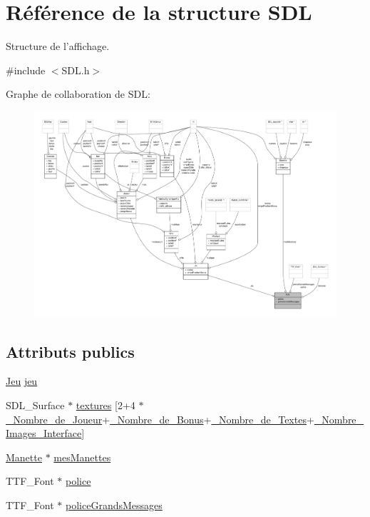 \hypertarget{structSDL}{\section{Référence de la structure S\-D\-L}
\label{structSDL}
}


Structure de l'affichage.  




{\ttfamily \#include $<$S\-D\-L.\-h$>$}



Graphe de collaboration de S\-D\-L\-:\nopagebreak
\begin{figure}[H]
\begin{center}
\leavevmode
\includegraphics[width=350pt]{structSDL__coll__graph}
\end{center}
\end{figure}
\subsection*{Attributs publics}
\begin{DoxyCompactItemize}
\item 
\hyperlink{structJeu}{Jeu} \hyperlink{structSDL_aed6e34a843f7e278abbc6401e7a86748}{jeu}
\item 
S\-D\-L\-\_\-\-Surface $\ast$ \hyperlink{structSDL_a7a8c5288d76cf72d0f5ba90ef4046d58}{textures} \mbox{[}2+4 $\ast$\hyperlink{Constantes_8h_a505b3b803482fbd73a5eafac78db730f}{\-\_\-\-Nombre\-\_\-de\-\_\-\-Joueur}+\hyperlink{Constantes_8h_af4e31715ab308023d6200e64b86b9946}{\-\_\-\-Nombre\-\_\-de\-\_\-\-Bonus}+\hyperlink{Constantes_8h_a64872e3ddf1efd6847f90dbcb0ed21ce}{\-\_\-\-Nombre\-\_\-de\-\_\-\-Textes}+\hyperlink{Constantes_8h_a228aa6ff538af983b44e972225d962b9}{\-\_\-\-Nombre\-\_\-\-Images\-\_\-\-Interface}\mbox{]}
\item 
\hyperlink{structManette}{Manette} $\ast$ \hyperlink{structSDL_ace23bf8418b8f58e086b6e608e9d0ba0}{mes\-Manettes}
\item 
T\-T\-F\-\_\-\-Font $\ast$ \hyperlink{structSDL_a1ad36295e29f111c716ccdb0e7265a4e}{police}
\item 
T\-T\-F\-\_\-\-Font $\ast$ \hyperlink{structSDL_a6b8f503288d42f8dbe8bb3ff97629404}{police\-Grands\-Messages}
\end{DoxyCompactItemize}


